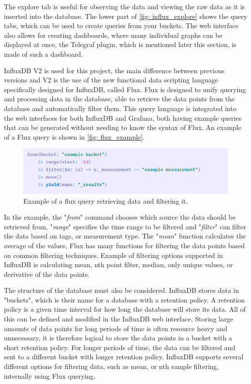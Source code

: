 \documentclass[main.tex]{subfiles}
\begin{document}
The explore tab is useful for observing the data and viewing the raw data as it is inserted into the database. The lower part of \autoref{fig: influx_explore} shows the query tabs, which can be used to create queries from your buckets. The web interface also allows for creating dashboards, where many individual graphs can be displayed at once, the Telegraf plugin, which is mentioned later this section, is made of such a dashboard.

InfluxDB V2 is used for this project, the main difference between previous versions and V2 is the use of the new functional data scripting language specifically designed for InfluxDB, called Flux. Flux is designed to unify querying and processing data in the database, able to retrieve the data points from the database and automatically filter them. This query language is integrated into the web interfaces for both InfluxDB and Grafana, both having example queries that can be generated without needing to know the syntax of Flux. An example of a Flux query is shown in \autoref{fig: flux_example}.

\begin{figure}[!htpb]
    \centering
    \includegraphics[width=17cm, scale=4]{images/flux_example.png}
    \caption{Example of a flux query retrieving data and filtering it.}
    \label{fig: flux_example}
\end{figure}
\FloatBarrier

In the example, the "\textit{from}" command chooses which source the data should be retrieved from, "\textit{range}" specifies the time range to be filtered and "\textit{filter}" can filter the data based on tags, or measurement type. The "\textit{mean}" function calculates the average of the values, Flux has many functions for filtering the data points based on common filtering techniques. Example of filtering options supported in InfluxDB is calculating mean, nth point filter, median, only unique values, or derivative of the data points.


The structure of the database must also be considered. InfluxDB stores data in "buckets", which is their name for a database with a retention policy. A retention policy is a given time interval for how long the database will store its data. All of this can be defined and modified in the InfluxDB web interface. Storing large amounts of data points for long periods of time is often resource heavy and unnecessary, it is therefore logical to store the data points in a bucket with a short retention policy. For longer periods of time, the data can be filtered and sent to a different bucket with longer retention policy. InfluxDB supports several different options for filtering data, such as mean, or nth sample filtering, internally using Flux querying. 
\end{document}
